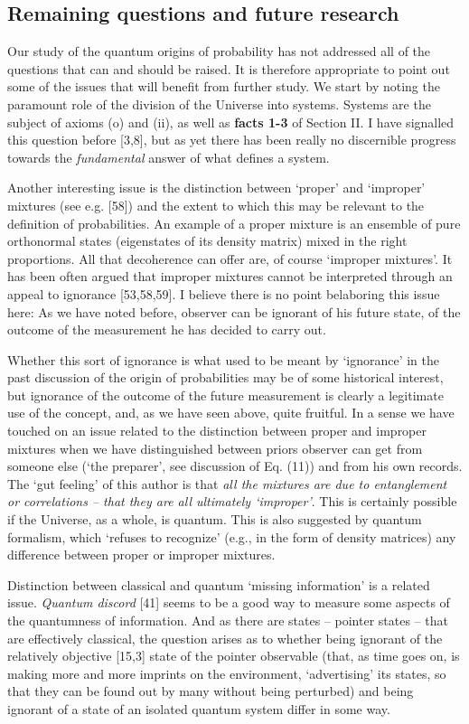 \documentclass[aps,pra,epsfig,11pt,floatfix]{revtex4}
\begin{document}
\subsection{Remaining questions and future research}

Our study of the quantum origins of probability has not addressed all of 
the questions that can and should be raised. It is therefore appropriate 
to point out some of the issues that will benefit from further study. We start 
by noting the paramount role of the division of the Universe into systems.
Systems are the subject of axioms (o) and (ii), as well as {\bf facts 1-3} 
of Section II. I have signalled this question before [3,8], but as yet there 
has been really no discernible progress towards the {\it fundamental} answer
of what defines a system.

Another interesting issue is the distinction between `proper' and `improper'
mixtures (see e.g. [58]) and the extent to which this may be relevant to the
definition of probabilities. An example of a proper mixture is an ensemble of
pure orthonormal states (eigenstates of its density matrix) mixed in the right
proportions. All that decoherence can offer are, of course `improper mixtures'.
It has been often argued that improper mixtures cannot be interpreted through
an appeal to ignorance [53,58,59]. I believe there is no point belaboring this
issue here: As we have noted before, observer can be ignorant of his future
state, of the outcome of the measurement he has decided to carry out. 

Whether this sort of ignorance is what used to be meant by `ignorance' in 
the past discussion of the origin of probabilities may be of some historical 
interest, but ignorance of the outcome of the future measurement is clearly 
a legitimate use of the concept, and, as we have seen above, quite fruitful.
In a sense we have touched on an issue related to the distinction
between proper and improper mixtures when we have distinguished between
priors observer can get from someone else (`the preparer', see discussion
of Eq. (11)) and from his own records. The `gut feeling' of this
author is that {\it all the mixtures are due to entanglement or correlations --
that they are all ultimately `improper'}. This is certainly possible if the Universe, as
a whole, is quantum. This is also suggested by quantum formalism, which
`refuses to recognize' (e.g., in the form of density matrices) any difference
between proper or improper mixtures.

Distinction between classical and quantum `missing information' is a related
issue. {\it Quantum discord} [41] seems to be a good way to measure some
aspects of the quantumness of information. And as there are states -- pointer
states -- that are effectively classical, the question arises as to whether
being ignorant of the relatively objective [15,3] state of the pointer
observable (that, as time goes on, is making more and more imprints on the
environment, `advertising' its states, so that they can be found out by many
without being perturbed) and being ignorant of a state of an isolated quantum
system differ in some way.
\end{document}
